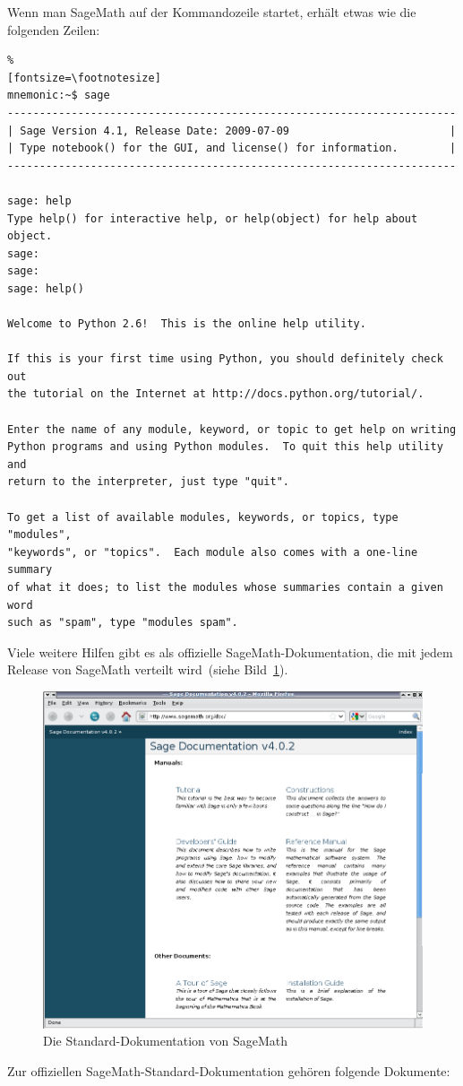 Wenn man SageMath auf der Kommandozeile startet, erhält etwas wie die folgenden Zeilen:
%
\begin{Verbatim}%
[fontsize=\footnotesize]
mnemonic:~$ sage
----------------------------------------------------------------------
| Sage Version 4.1, Release Date: 2009-07-09                         |
| Type notebook() for the GUI, and license() for information.        |
----------------------------------------------------------------------

sage: help
Type help() for interactive help, or help(object) for help about object.
sage:
sage:
sage: help()

Welcome to Python 2.6!  This is the online help utility.

If this is your first time using Python, you should definitely check out
the tutorial on the Internet at http://docs.python.org/tutorial/.

Enter the name of any module, keyword, or topic to get help on writing
Python programs and using Python modules.  To quit this help utility and
return to the interpreter, just type "quit".

To get a list of available modules, keywords, or topics, type "modules",
"keywords", or "topics".  Each module also comes with a one-line summary
of what it does; to list the modules whose summaries contain a given word
such as "spam", type "modules spam".
\end{Verbatim}
%
Viele weitere Hilfen gibt es als offizielle SageMath-Dokumentation, die mit jedem
Release von SageMath verteilt wird~(siehe Bild~\ref{fig:sage_standard_doc}).
%
\begin{figure}[!htpb]
\centering
\includegraphics[scale=0.4]{figures/sage-online-doc}
\caption{Die Standard-Dokumentation von SageMath}
\label{fig:sage_standard_doc}
\end{figure}
%
Zur offiziellen SageMath-Standard-Dokumentation gehören folgende Dokumente:

